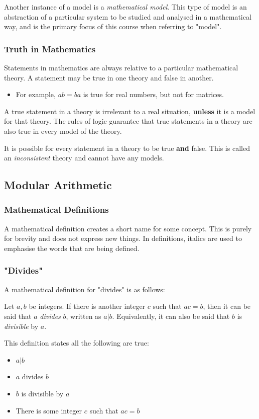 \documentclass{article}
\begin{document}
Another instance of a model is a \emph{mathematical model}. 
This type of model is an abstraction of a particular system to be studied and analysed in a mathematical way,
and is the primary focus of this course when referring to "model".
%
\subsubsection{Truth in Mathematics}
Statements in mathematics are always relative to a particular mathematical theory.
A statement may be true in one theory and false in another.
\begin{itemize}
    \item For example, \(ab = ba\) is true for real numbers, but not for matrices.
\end{itemize}
A true statement in a theory is irrelevant to a real situation, \textbf{unless} it is a model for that theory.
The rules of logic guarantee that true statements in a theory are also true in every model of the theory.
\begin{tcolorbox}[title=Note]
    It is possible for every statement in a theory to be true \textbf{and} false.
    This is called an \emph{inconsistent} theory and cannot have any models.
\end{tcolorbox}

\subsection{Modular Arithmetic}
\subsubsection{Mathematical Definitions}
A mathematical definition creates a short name for some concept.
This is purely for brevity and does not express new things.
In definitions, italics are used to emphasise the words that are being defined.
%
\subsubsection{"Divides"}
A mathematical definition for "divides" is as follows:
\begin{tcolorbox}[title=Divides Definition]
    Let \(a, b\) be integers.
    If there is another integer \(c\) such that \(ac = b\),
    then it can be said that \(a\) \emph{divides} \(b\),
    written as \(a \vert b\).
    Equivalently, it can also be said that  \(b\) is \emph{divisible} by \(a\).
\end{tcolorbox}
\noindent
This definition states all the following are true:
\begin{itemize}
    \item \(a \vert b\)
    \item \(a\) divides \(b\)
    \item \(b\) is divisible by \(a\)
    \item There is some integer \(c\) such that \(ac = b\)
\end{itemize}
%
\newpage
\end{document}
